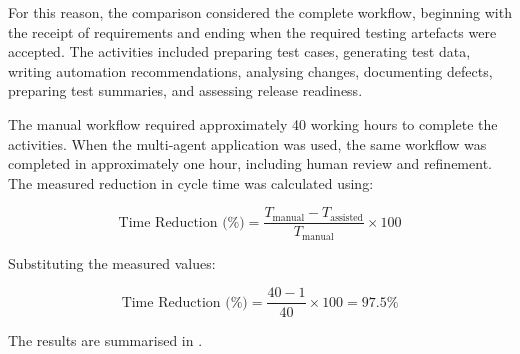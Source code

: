 For this reason, the comparison considered the complete workflow, beginning with the receipt of requirements and ending when the required testing artefacts were accepted. The activities included preparing test cases, generating test data, writing automation recommendations, analysing changes, documenting defects, preparing test summaries, and assessing release readiness.

The manual workflow required approximately 40 working hours to complete the activities. When the multi-agent application was used, the same workflow was completed in approximately one hour, including human review and refinement. The measured reduction in cycle time was calculated using:

\begin{equation}
\text{Time Reduction (\%)} =
\frac{T_{\text{manual}} - T_{\text{assisted}}}
{T_{\text{manual}}}
\times 100
\label{eq:time-reduction}
\end{equation}

Substituting the measured values:

\begin{equation}
\text{Time Reduction (\%)} =
\frac{40 - 1}{40} \times 100 = 97.5\%
\end{equation}

The results are summarised in .

